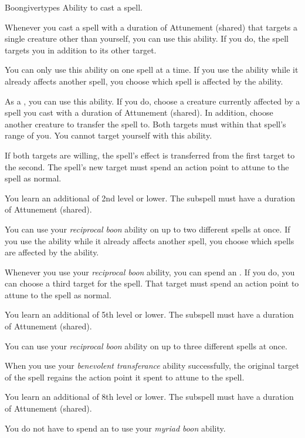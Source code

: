     \begin{feat}{Boongiver}{types}
        \featpre Ability to cast a spell.
        \featben

         Whenever you cast a spell with a duration of Attunement (shared) that targets a single creature other than yourself, you can use this ability.
        If you do, the spell targets you in addition to its other target.

        You can only use this ability on one spell at a time.
        If you use the ability while it already affects another spell, you choose which spell is affected by the ability.

         As a , you can use this ability.
        If you do, choose a creature currently affected by a spell you cast with a duration of Attunement (shared).
        In addition, choose another creature to transfer the spell to.
        Both targets must within that spell's range of you.
        You cannot target yourself with this ability.

        If both targets are willing, the spell's effect is transferred from the first target to the second.
        The spell's new target must spend an action point to attune to the spell as normal.

         You learn an additional  of 2nd level or lower.
        The subspell must have a duration of Attunement (shared).

         You can use your \textit{reciprocal boon} ability on up to two different spells at once.
        If you use the ability while it already affects another spell, you choose which spells are affected by the ability.

         Whenever you use your \textit{reciprocal boon} ability, you can spend an .
        If you do, you can choose a third target for the spell.
        That target must spend an action point to attune to the spell as normal.

         You learn an additional  of 5th level or lower.
        The subspell must have a duration of Attunement (shared).

         You can use your \textit{reciprocal boon} ability on up to three different spells at once.

         When you use your \textit{benevolent transferance} ability successfully, the original target of the spell regains the action point it spent to attune to the spell.

         You learn an additional  of 8th level or lower.
        The subspell must have a duration of Attunement (shared).

         You do not have to spend an  to use your \textit{myriad boon} ability.

    \end{feat}

